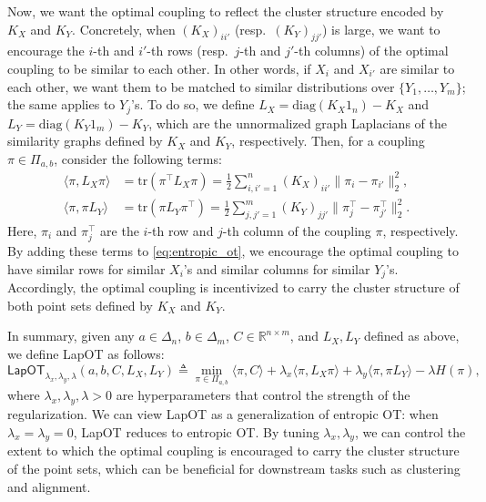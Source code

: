\documentclass{article}
\theoremstyle{definition}
\newcommand{\R}{\mathbb{R}}
\begin{document}
Now, we want the optimal coupling to reflect the cluster structure encoded by $K_X$ and $K_Y$. Concretely, when $(K_X)_{i i'}$ (resp.\ $(K_Y)_{j j'}$) is large, we want to encourage the $i$-th and $i'$-th rows (resp.\ $j$-th and $j'$-th columns) of the optimal coupling to be similar to each other. In other words, if $X_i$ and $X_{i'}$ are similar to each other, we want them to be matched to similar distributions over $\{Y_1, \ldots, Y_m\}$; the same applies to $Y_j$'s. To do so, we define $L_X = \mathrm{diag}(K_X 1_n) - K_X$ and $L_Y = \mathrm{diag}(K_Y 1_m) - K_Y$, which are the unnormalized graph Laplacians of the similarity graphs defined by $K_X$ and $K_Y$, respectively. Then, for a coupling $\pi \in \Pi_{a, b}$, consider the following terms:
\begin{equation}
    \label{eq:laplacian_terms}
    \begin{aligned}
        \langle \pi, L_X \pi \rangle & = \mathrm{tr}(\pi^\top L_X\pi) = \frac{1}{2} \sum_{i, i' = 1}^{n} (K_{X})_{i i'} \|\pi_i - \pi_{i'}\|_2^2, \\
        \langle \pi, \pi L_Y \rangle & = \mathrm{tr}(\pi L_Y \pi^\top) = \frac{1}{2}\sum_{j, j' = 1}^{m}(K_{Y})_{j j'}\|\pi^\top_j - \pi^\top_{j'}\|_2^2.
    \end{aligned}
\end{equation}
Here, $\pi_i$ and $\pi^\top_j$ are the $i$-th row and $j$-th column of the coupling $\pi$, respectively. By adding these terms to \eqref{eq:entropic_ot}, we encourage the optimal coupling to have similar rows for similar $X_i$'s and similar columns for similar $Y_j$'s. Accordingly, the optimal coupling is incentivized to carry the cluster structure of both point sets defined by $K_X$ and $K_Y$.

In summary, given any $a \in \Delta_n$, $b \in \Delta_m$, $C \in \R^{n \times m}$, and $L_X, L_Y$ defined as above, we define LapOT as follows:
\begin{equation}
    \label{eq:LapOT}
    \mathsf{LapOT}_{\lambda_x, \lambda_y, \lambda}(a, b, C, L_X, L_Y) \triangleq \min_{\pi \in \Pi_{a, b}} \langle \pi, C \rangle + \lambda_x \langle \pi, L_X \pi \rangle + \lambda_y \langle \pi, \pi L_Y \rangle - \lambda H(\pi),
\end{equation}
where $\lambda_x, \lambda_y, \lambda > 0$ are hyperparameters that control the strength of the regularization. We can view LapOT as a generalization of entropic OT: when $\lambda_x = \lambda_y = 0$, LapOT reduces to entropic OT. By tuning $\lambda_x, \lambda_y$, we can control the extent to which the optimal coupling is encouraged to carry the cluster structure of the point sets, which can be beneficial for downstream tasks such as clustering and alignment.
\end{document}
